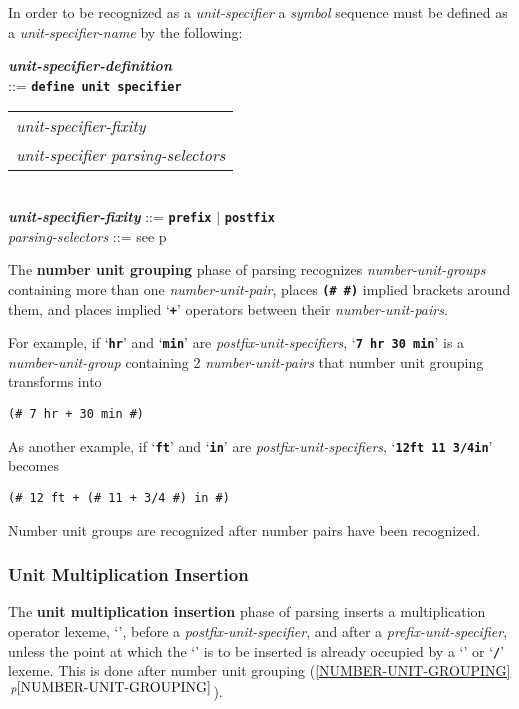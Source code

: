 \documentclass[12pt]{article}
\newcommand{\TT}[1]{{\tt \bfseries #1}}
\newcommand{\key}[1]{{\rm \bfseries #1}}
\newcommand{\ttkey}[1]{{\tt \bfseries #1}}
\newcommand{\emkey}[1]{{\em \bfseries #1}}
\newcommand{\itemref}[1]{\ref{#1}$\,^{p\pageref{#1}}$}
\newcommand{\pagref}[1]{p\pageref{#1}}
\newenvironment{indpar}[1][0.3in]%
	{\begin{list}{}%
		     {\setlength{\itemsep}{0in}%
		      \setlength{\topsep}{0in}%
		      \setlength{\parsep}{1ex}%
		      \setlength{\labelwidth}{#1}%
		      \setlength{\leftmargin}{#1}%
		      \addtolength{\leftmargin}{\labelsep}}%
	 \item}%
	{\end{list}}
\begin{document}
In order to be recognized as a {\em unit-specifier} a {\em symbol} sequence
must be defined as a {\em unit-specifier-name} by the following:

\begin{indpar}
\emkey{unit-specifier-definition} \\
	\hspace*{0.5in}::= \TT{define unit specifier}
	    \begin{tabular}[t]{l}
	    {\em unit-specifier-fixity} \\
	    {\em unit-specifier} {\em parsing-selectors}
	    \end{tabular}
\label{UNIT-SPECIFIER-DEFINITION}
	    \\[1ex]
\emkey{unit-specifier-fixity} ::= \ttkey{prefix} $|$ \ttkey{postfix}
	\\[1ex]
{\em parsing-selectors} ::= see \pagref{PARSING-SELECTORS}
\end{indpar}

The \key{number unit grouping} phase of
parsing recognizes {\em number-unit-groups} containing more than
one {\em number-unit-pair}, places
\TT{(\# \#)} implied brackets around them,
and places implied `\TT{+}' operators
between their {\em number-unit-pairs}.

For example, if `\TT{hr}' and `\TT{min}'
are {\em postfix-unit-specifiers},
`\TT{7 hr 30 min}' is a {\em number-unit-group} containing
2 {\em number-unit-pairs} that number unit grouping transforms into
\begin{center}
\verb/(# 7 hr + 30 min #)/
\end{center}
As another example,
if `\TT{ft}' and `\TT{in}' are {\em postfix-unit-specifiers},
`\TT{12ft 11 3/4in}' becomes
\begin{center}
\verb|(# 12 ft + (# 11 + 3/4 #) in #)|
\end{center}

Number unit groups are recognized after number pairs have been
recognized.

\subsubsection{Unit Multiplication Insertion}
\label{UNIT-MULTIPLICATION-INSERTION}

The \key{unit multiplication insertion} phase of
parsing inserts a multiplication operator lexeme, `\TT{*}',
before a {\em postfix-unit-specifier}, and
after a {\em prefix-unit-specifier}, unless the point at which the
`\TT{*}' is to be inserted is already occupied by a
`\TT{*}' or `\TT{/}' lexeme.  This is done after number unit
grouping (\itemref{NUMBER-UNIT-GROUPING}).
\end{document}
